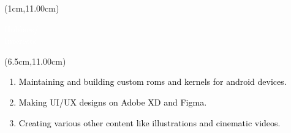 \documentclass[10pt,a4paper,twocolumn]{article}
\begin{document}
\begin{textblock*}{3.6cm}(1cm,11.00cm)
   \begin{mdframed}[style=Frame1]
   \textcolor{white}{\fontsize{20}{20}\selectfont Hobbies/\\Interests}
   \end{mdframed}
\end{textblock*}
\begin{textblock*}{14cm}(6.5cm,11.00cm)
\begin{enumerate}
    \item \textcolor{black}{\fontsize{14}{20}\selectfont Maintaining and building custom\vspace{1mm} roms and kernels for android devices.}
    \item \textcolor{black}{\fontsize{14}{20}\selectfont Making UI/UX designs on Adobe XD and Figma.}
    \item \textcolor{black}{\fontsize{14}{20}\selectfont Creating various other content like illustrations and cinematic \vspace{1mm} videos.}
\end{enumerate}
\end{textblock*}
\end{document}

